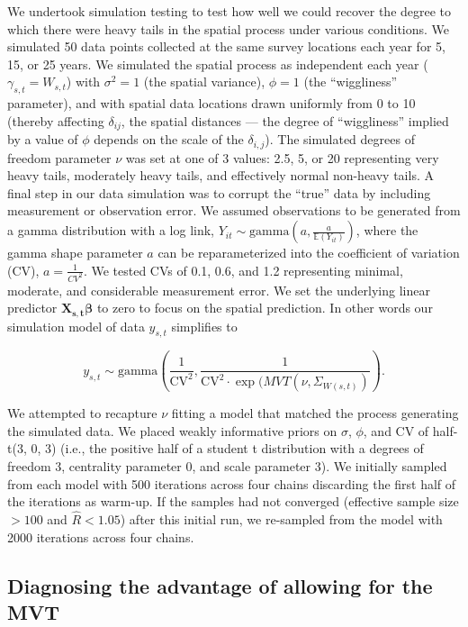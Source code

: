 \documentclass[12pt,english]{article}
\begin{document}
\begin{spacing}{1.25}
We undertook simulation testing to test how well we could recover the degree to
which there were heavy tails in the spatial process under various conditions.
We simulated 50 data points collected at the same survey locations each year
for 5, 15, or 25 years. We simulated the spatial process as independent each
year ($\gamma_{s,t} = W_{s,t}$) with $\sigma^2 = 1$ (the spatial variance),
$\phi = 1$ (the ``wiggliness'' parameter), and with spatial data locations
drawn uniformly from 0 to 10 (thereby affecting $\delta_{ij}$, the spatial
distances --- the degree of ``wiggliness'' implied by a value of $\phi$ depends
on the scale of the $\delta_{i,j}$). The simulated degrees of freedom parameter
$\nu$ was set at one of 3 values: 2.5, 5, or 20 representing very heavy tails,
moderately heavy tails, and effectively normal non-heavy tails. A final step in
our data simulation was to corrupt the ``true'' data by including measurement
or observation error. We assumed observations to be generated from a gamma
distribution with a log link, $Y_{it}\sim \mathrm{gamma}\left(a,\frac
  {a}{\mathbb{E}(Y_{it})} \right)$, where the gamma shape parameter $a$ can be
reparameterized into the coefficient of variation (CV), $a=\frac{1}{CV^2}$. We
tested CVs of 0.1, 0.6, and 1.2 representing minimal, moderate, and
considerable measurement error. We set the underlying linear predictor
$\bm{X_{s,t}} \bm{\beta}$ to zero to focus on the spatial prediction. In other words our simulation model of data $y_{s,t}$ simplifies to

\begin{equation}
  y_{s,t} \sim \mathrm{gamma} \left( \frac{1}{\mathrm{CV}^2},
  \frac{1}{\mathrm{CV}^2 \cdot \exp(MVT(\nu, \Sigma_{W(s,t)})} \right).
\end{equation}

We attempted to recapture $\nu$ fitting a model that matched the process
generating the simulated data. We placed weakly informative priors on $\sigma$,
$\phi$, and CV of half-t(3, 0, 3) (i.e., the positive half of a student t
distribution with a degrees of freedom 3, centrality parameter 0, and scale
parameter 3). We initially sampled from each model with 500 iterations across
four chains discarding the first half of the iterations as warm-up. If the
samples had not converged (effective sample size $> 100$ and $\hat{R} < 1.05$)
after this initial run, we re-sampled from the model with
2000 iterations across four chains. 

\subsection{Diagnosing the advantage of allowing for the MVT}


\end{spacing}
\end{document}
